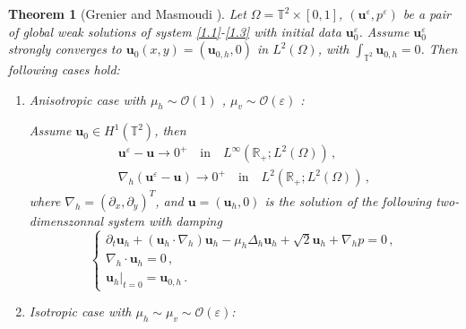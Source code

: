 \documentclass[pdflatex,sn-mathphys-num]{sn-jnl}%
\theoremstyle{thmstyleone}%
\newtheorem{theorem}{Theorem}%
\theoremstyle{thmstyletwo}%
\theoremstyle{thmstylethree}%
\theoremstyle{thmstyletwo}
\begin{document}
\begin{theorem}[Grenier and Masmoudi \cite{Grenier1997}]\label{thmGrenier}
	Let $\Omega=\mathbb{T}^2\times[0,1]$, 
	$(\boldsymbol{u}^\varepsilon,{p}^\varepsilon)$ be a pair of global weak solutions of system \eqref{1.1}-\eqref{1.3} with initial data $\boldsymbol{u}_0^\varepsilon$.
	Assume $\boldsymbol{u}_0^\varepsilon$ strongly converges to ${\boldsymbol{u}}_0 (x,y)= ({\boldsymbol{u}}_{0,h}, 0)$ in $L^2(\Omega)$,  with $\int_{\mathbb{T}^2} {\boldsymbol{u}}_{0,h} = 0$. 
	Then  following cases hold:
	\begin{enumerate}[1.]
		\item{Anisotropic case with $\mu_h\sim \mathcal{O}(1)$ , $ \mu_v\sim \mathcal{O}(\varepsilon)$ :}
		
		Assume ${\boldsymbol{u}}_0\in H^1(\mathbb{T}^2)$, then
		\begin{align*}
			\boldsymbol{u}^\varepsilon-{\boldsymbol{u}}\rightarrow 0^+\quad\text{in}\quad L^\infty(\mathbb{R_+};L^2(\Omega))
			\,, \\
			\nabla_{ h}(\boldsymbol{u}^\varepsilon-{\boldsymbol{u}})\rightarrow 0^+\quad\text{in}\quad L^2(\mathbb{R_+};L^2(\Omega))\,,
		\end{align*}
		where  $\nabla_h=(\partial_x,\partial_y)^T$, and ${\boldsymbol{u}}=(\boldsymbol{u}_h,0)$ is the solution of the following two-dimenszonnal system with damping
		\begin{equation}\label{1.6}
			\begin{cases}
				\partial_{t}  {\boldsymbol u}_h+( {\boldsymbol u}_h \cdot \nabla_h)  {\boldsymbol u}_h
				-\mu_{h}\Delta_{h} {\boldsymbol{u}}_h
				+\sqrt{2}{\boldsymbol u}_h+\nabla_h p=0\,,\\
				\nabla_h\cdot {\boldsymbol u}_h=0\,,\\
				{\boldsymbol u}_h|_{t=0}= {\boldsymbol u}_{0,h}\,.
			\end{cases}
		\end{equation}
		\item{Isotropic case with $\mu_h \sim \mu_v\sim \mathcal{O}(\varepsilon)$:}
		

\end{enumerate}
\end{theorem}
\end{document}
